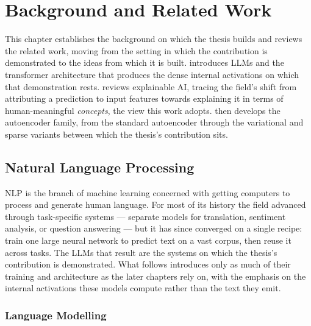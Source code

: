 \chapter{Background and Related Work} \label{ch:background}

This chapter establishes the background on which the thesis builds and reviews
the related work, moving from the setting in which the contribution is
demonstrated to the ideas from which it is built. 
introduces \aclp*{LLM} and the transformer architecture that produces the dense
internal activations on which that demonstration rests.
 reviews explainable AI,
tracing the field's shift from attributing a prediction to input features
towards explaining it in terms of human-meaningful \textit{concepts}, the view
this work adopts.  then
develops the autoencoder family, from the standard autoencoder through the
variational and sparse variants between which the thesis's contribution sits.

\section{Natural Language Processing} \label{sec:background:nlp}

\Ac{NLP} is the branch of machine learning concerned with getting computers to
process and generate human language. For most of its history the field advanced
through task-specific systems --- separate models for translation, sentiment
analysis, or question answering --- but it has since converged on a single
recipe: train one large neural network to predict text on a vast corpus, then
reuse it across tasks. The \acp{LLM} that result are the systems on which the
thesis's contribution is demonstrated. What follows introduces only as much of
their training and architecture as the later chapters rely on, with the emphasis
on the internal activations these models compute rather than the text they
emit.

\subsection{Language Modelling} \label{sec:background:nlp:lm}

